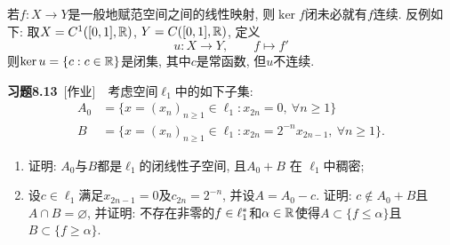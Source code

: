 	\begin{Remark}
	若$ f : X\to Y $是一般地赋范空间之间的线性映射, 则$ \ker f $闭未必就有$ f $连续. 反例如下: 取$ X=C^1([0,1],\mathbb{R}) $, $ Y=C([0,1],\mathbb{R}) $, 定义
	\[
	u : X\to Y ,\qquad f\mapsto f'
	\]
	则$ \ker u=\{ c : c\in\mathbb{R} \} $是闭集, 其中$ c $是常函数, 但$ u $不连续.
	\end{Remark}

	\textbf{习题8.13}\ [作业]\ \ 考虑空间$ \ell_1 $中的如下子集:
	\[
	\begin{aligned}
	A_0&=\{ x=(x_n)_{n\geqslant 1}\in\ell_1 : x_{2n}=0,\ \forall n\geqslant 1 \}\\
	B&=\{ x=(x_n)_{n\geqslant 1}\in\ell_1 : x_{2n}=2^{-n}x_{2n-1},\ \forall n\geqslant 1 \}.
	\end{aligned}
	\]
	\begin{enumerate}[(1)]
	\item 证明: $ A_0 $与$ B $都是$ \ell_1 $的闭线性子空间, 且$ A_0+B$ 在 $\ell_1 $中稠密;
	\item 设$ c\in\ell_1 $满足$ x_{2n-1}=0 $及$ c_{2n}=2^{-n} $, 并设$ A=A_0-c $. 证明: $ c\notin A_0+B $且$ A\cap B=\varnothing $, 并证明: 不存在非零的$ f\in\ell_1^{*} $和$ \alpha\in\mathbb{R} $使得$ A\subset\{ f\leqslant\alpha \} $且$ B\subset\{ f\geqslant\alpha \} $.
	\end{enumerate}
